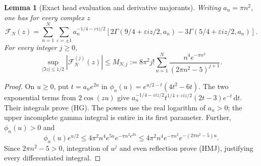 \documentclass[11pt]{article}
\newtheorem{lemma}[theorem]{Lemma}
\theoremstyle{remark}\newtheorem{remark}[theorem]{Remark}
\newcommand{\dd}{\,\mathrm d}
\begin{document}
\begin{lemma}[Exact head evaluation and derivative majorants]
\label{lem:head-gamma}
Writing $a_n=\pi n^2$, one has for every complex $z$
\[
 \mathcal F_N(z)=\sum_{n=1}^N\sum_{\varepsilon=\pm1}
 a_n^{-1/4-\varepsilon iz/2}
 \left[2\Gamma(9/4+\varepsilon iz/2,a_n)
       -3\Gamma(5/4+\varepsilon iz/2,a_n)\right].        \tag{HG}
\]
For every integer $j\ge0$,
\[
 \sup_{|\Im z|\le1/2}|\mathcal F_N^{(j)}(z)|
 \le M_{N,j}:=
 8\pi^2j!\sum_{n=1}^N
             \frac{n^4e^{-\pi n^2}}{(2\pi n^2-5)^{j+1}}. \tag{HMJ}
\]
\end{lemma}
\begin{proof}
On $u\ge0$, put $t=a_ne^{2u}$ in
$\phi_n(u)=e^{u/2-t}(4t^2-6t)$.
The two exponential terms from $2\cos(zu)$ give
$a_n^{-1/4-\varepsilon iz/2}t^{1/4+\varepsilon iz/2}(2t-3)e^{-t}\dd t$.
Their integrals prove (HG). The powers use the real logarithm of $a_n>0$;
the upper incomplete gamma integral is entire in its first parameter.
Further, $\phi_n(u)>0$ and
\[
 \phi_n(u)e^{u/2}
 \le4\pi^2n^4e^{5u}e^{-\pi n^2e^{2u}}
 \le4\pi^2n^4e^{-\pi n^2}e^{-(2\pi n^2-5)u}.
\]
Since $2\pi n^2-5>0$, integration of $u^j$ and even reflection prove
(HMJ), justifying every differentiated integral.
\end{proof}
\end{document}

